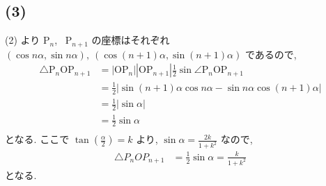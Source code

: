 \documentclass[a4j, 11pt]{jarticle}
\begin{document}
\subsection*{(3)}
 (2) より P$_n$, \ P$_{n + 1}$ の座標はそれぞれ $(\cos n \alpha, \sin n \alpha), \ (\cos (n + 1) \alpha, \sin (n + 1) \alpha)$ であるので,
  \begin{align*}
   \triangle \textrm{P}_n \textrm{O} \textrm{P}_{n + 1} &= |\textrm{O} \textrm{P}_n| |\textrm{O} \textrm{P}_{n + 1}| \frac{1}{2} \sin \angle \textrm{P}_n \textrm{O} \textrm{P}_{n + 1} \\
                                   &= \frac{1}{2} \left| \sin (n + 1) \alpha \cos n \alpha - \sin n \alpha \cos (n + 1) \alpha \right| \\
                                   &= \frac{1}{2} \left| \sin \alpha \right| \\
                                   &= \frac{1}{2} \sin \alpha \\
  \end{align*}
 となる. ここで $\displaystyle \tan \left( \frac{\alpha}{2} \right) = k$ より, $\sin \alpha = \displaystyle \frac{2k}{1 + k^2}$ なので, 
  \begin{align*}
   \triangle P_n O P_{n + 1} &= \frac{1}{2} \sin \alpha = \frac{k}{1 + k^2}
  \end{align*}
 となる.
\end{document}
